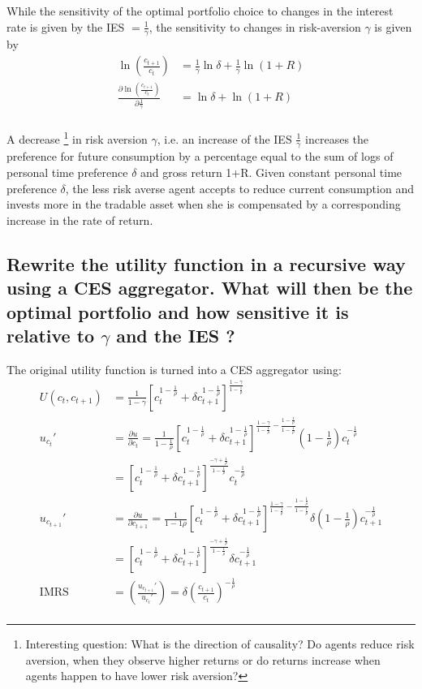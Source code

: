 \documentclass[12pt]{article}
\begin{document}
	While the sensitivity of the optimal portfolio choice to changes in the interest rate is given by the IES $= \frac{1}{\gamma}$, the sensitivity to changes in risk-aversion $\gamma$ is given by
	\begin{align*}
		\ln \left(\frac{c_{t+1}}{c_t}\right) &= \frac{1}{\gamma} \ln \delta + \frac{1}{\gamma} \ln (1+R)\\
		\frac{\partial \ln \left(\frac{c_{t+1}}{c_t}\right)}{\partial \frac{1}{\gamma}} &= \ln \delta + \ln (1+R)\\
	\end{align*}
	
	A decrease \footnote{Interesting question: What is the direction of causality? Do agents reduce risk aversion, when they observe higher returns or do returns increase when agents happen to have lower risk aversion?} in risk aversion $\gamma$, i.e. an increase of the IES $\frac{1}{\gamma}$ increases the preference for future consumption by a percentage equal to the sum of logs of personal time preference $\delta$ and gross return 1+R. Given constant personal time preference $\delta$, the less risk averse agent accepts to reduce current consumption and invests more in the tradable asset when she is compensated by a corresponding increase in the rate of return. 
	
	\subsection{Rewrite the utility function in a recursive way using a CES aggregator. What will then be the optimal portfolio and how sensitive it is relative to $\gamma$ and the IES ?}
	The original utility function is turned into a CES aggregator using:
	\begin{align*}
		U(c_t, c_{t+1}) &= \frac{1}{1-\gamma} \left[c_t^{1-\frac{1}{\rho}} + \delta c_{t+1}^{1-\frac{1}{\rho}}\right]^{\frac{1-\gamma}{1-\frac{1}{\rho}}}\\
		u_{c_t}' &= \frac{\partial u}{\partial c_t} = \frac{1}{1-\frac{1}{\rho}}\left[c_t^{1-\frac{1}{\rho}} + \delta c_{t+1}^{1-\frac{1}{\rho}}\right]^{\frac{1-\gamma}{1-\frac{1}{\rho}} - \frac{1-\frac{1}{\rho}}{1-\frac{1}{\rho}}} (1-\frac{1}{\rho})c_t^{-\frac{1}{\rho}}\\
		&= \left[c_t^{1-\frac{1}{\rho}} + \delta c_{t+1}^{1-\frac{1}{\rho}}\right]^{\frac{-\gamma + \frac{1}{\rho}}{1-\frac{1}{\rho}}} c_t^{-\frac{1}{\rho}}\\
		u_{c_{t+1}}' &= \frac{\partial u}{\partial c_{t+1}} = \frac{1}{1-1\rho}\left[c_t^{1-\frac{1}{\rho}} + \delta c_{t+1}^{1-\frac{1}{\rho}}\right]^{\frac{1-\gamma}{1-\frac{1}{\rho}} - \frac{1-\frac{1}{\rho}}{1-\frac{1}{\rho}}} \delta (1-\frac{1}{\rho})c_{t+1}^{-\frac{1}{\rho}}\\
		&= \left[c_t^{1-\frac{1}{\rho}} + \delta c_{t+1}^{1-\frac{1}{\rho}}\right]^{\frac{-\gamma + \frac{1}{\rho}}{1-\frac{1}{\rho}}} \delta c_{t+1}^{-\frac{1}{\rho}}\\
		\text{IMRS} &= \left( \frac{u_{c_{t+1}}'}{u_{c_t}'} \right) = \delta \left(\frac{c_{t+1}}{c_t}\right)^{-\frac{1}{\rho}}\\
	\end{align*}
	
\end{document}
